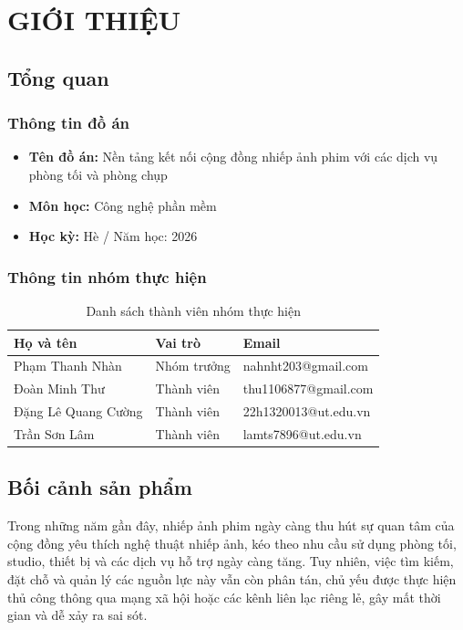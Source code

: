 \chapter{GIỚI THIỆU}

\section{Tổng quan}

\subsection{Thông tin đồ án}
\begin{itemize}
	\item\textbf{Tên đồ án:} Nền tảng kết nối cộng đồng nhiếp ảnh phim với các dịch vụ phòng tối và phòng chụp 
	\item\textbf{Môn học:} Công nghệ phần mềm 
	\item\textbf{Học kỳ:} Hè / Năm học: 2026
\end{itemize}

\subsection{Thông tin nhóm thực hiện}
\begin{table}[H]
	\centering
	\begin{tabular}{|l|l|l|}
		\hline
		\textbf{Họ và tên} & \textbf{Vai trò} & \textbf{Email} \\
		\hline
		Phạm Thanh Nhàn & Nhóm trưởng & nahnht203@gmail.com \\
		\hline
		Đoàn Minh Thư & Thành viên & thu1106877@gmail.com \\
		\hline
		Đặng Lê Quang Cường & Thành viên & 22h1320013@ut.edu.vn  \\
		\hline
		Trần Sơn Lâm & Thành viên & lamts7896@ut.edu.vn\\
		\hline
	\end{tabular}
	\caption{Danh sách thành viên nhóm thực hiện}
\end{table}

\section{Bối cảnh sản phẩm}

Trong những năm gần đây, nhiếp ảnh phim ngày càng thu hút sự quan tâm của cộng đồng yêu thích nghệ thuật nhiếp ảnh, kéo theo nhu cầu sử dụng phòng tối, studio, thiết bị và các dịch vụ hỗ trợ ngày càng tăng. Tuy nhiên, việc tìm kiếm, đặt chỗ và quản lý các nguồn lực này vẫn còn phân tán, chủ yếu được thực hiện thủ công thông qua mạng xã hội hoặc các kênh liên lạc riêng lẻ, gây mất thời gian và dễ xảy ra sai sót.

